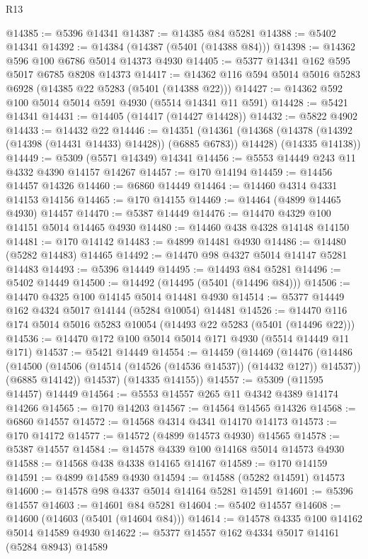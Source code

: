 \begin{lexlean}{R13}
\begin{coremodule}
@14385 := @5396 @14341
@14387 := @14385 @84 @5281
@14388 := @5402 @14341
@14392 := @14384 (@14387 (@5401 (@14388 @84)))
@14398 := @14362 @596 @100 @6786 @5014 @14373 @4930
@14405 := @5377 @14341 @162 @595 @5017 @6785 @8208 @14373
@14417 := @14362 @116 @594 @5014 @5016 @5283 @6928 (@14385 @22 @5283 (@5401 (@14388 @22)))
@14427 := @14362 @592 @100 @5014 @5014 @591 @4930 (@5514 @14341 @11 @591)
@14428 := @5421 @14341
@14431 := @14405 (@14417 (@14427 @14428))
@14432 := @5822 @4902
@14433 := @14432 @22
@14446 := @14351
    (@14361
      (@14368 (@14378 (@14392 (@14398 (@14431 @14433) @14428)) (@6885 @6783)) @14428)
      (@14335 @14138))
@14449 := @5309 (@5571 @14349) @14341
@14456 := @5553 @14449 @243 @11 @4332 @4390 @14157 @14267
@14457 := @170 @14194
@14459 := @14456 @14457 @14326
@14460 := @6860 @14449
@14464 := @14460 @4314 @4331 @14153 @14156
@14465 := @170 @14155
@14469 := @14464 (@4899 @14465 @4930) @14457
@14470 := @5387 @14449
@14476 := @14470 @4329 @100 @14151 @5014 @14465 @4930
@14480 := @14460 @438 @4328 @14148 @14150
@14481 := @170 @14142
@14483 := @4899 @14481 @4930
@14486 := @14480 (@5282 @14483) @14465
@14492 := @14470 @98 @4327 @5014 @14147 @5281 @14483
@14493 := @5396 @14449
@14495 := @14493 @84 @5281
@14496 := @5402 @14449
@14500 := @14492 (@14495 (@5401 (@14496 @84)))
@14506 := @14470 @4325 @100 @14145 @5014 @14481 @4930
@14514 := @5377 @14449 @162 @4324 @5017 @14144 (@5284 @10054) @14481
@14526 := @14470 @116 @174 @5014 @5016 @5283 @10054 (@14493 @22 @5283 (@5401 (@14496 @22)))
@14536 := @14470 @172 @100 @5014 @5014 @171 @4930 (@5514 @14449 @11 @171)
@14537 := @5421 @14449
@14554 := @14459
    (@14469
      (@14476
        (@14486
          (@14500 (@14506 (@14514 (@14526 (@14536 @14537)) (@14432 @127)) @14537))
          (@6885 @14142))
        @14537)
      (@14335 @14155))
@14557 := @5309 (@11595 @14457) @14449
@14564 := @5553 @14557 @265 @11 @4342 @4389 @14174 @14266
@14565 := @170 @14203
@14567 := @14564 @14565 @14326
@14568 := @6860 @14557
@14572 := @14568 @4314 @4341 @14170 @14173
@14573 := @170 @14172
@14577 := @14572 (@4899 @14573 @4930) @14565
@14578 := @5387 @14557
@14584 := @14578 @4339 @100 @14168 @5014 @14573 @4930
@14588 := @14568 @438 @4338 @14165 @14167
@14589 := @170 @14159
@14591 := @4899 @14589 @4930
@14594 := @14588 (@5282 @14591) @14573
@14600 := @14578 @98 @4337 @5014 @14164 @5281 @14591
@14601 := @5396 @14557
@14603 := @14601 @84 @5281
@14604 := @5402 @14557
@14608 := @14600 (@14603 (@5401 (@14604 @84)))
@14614 := @14578 @4335 @100 @14162 @5014 @14589 @4930
@14622 := @5377 @14557 @162 @4334 @5017 @14161 (@5284 @8943) @14589

\end{coremodule}
\end{lexlean}
